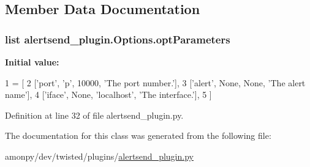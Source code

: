\subsection{Member Data Documentation}
\hypertarget{classalertsend__plugin_1_1_options_a2c75b6ad0c6ebcf82a12c75c4fe17c82}{
\subsubsection[{opt\-Parameters}]{\setlength{\rightskip}{0pt plus 5cm}list alertsend\-\_\-plugin.\-Options.\-opt\-Parameters\hspace{0.3cm}{\ttfamily [static]}}}\label{classalertsend__plugin_1_1_options_a2c75b6ad0c6ebcf82a12c75c4fe17c82}
{\bfseries Initial value\-:}
\begin{DoxyCode}
1 = [
2         [\textcolor{stringliteral}{'port'}, \textcolor{stringliteral}{'p'}, 10000, \textcolor{stringliteral}{'The port number.'}],
3         [\textcolor{stringliteral}{'alert'}, \textcolor{keywordtype}{None}, \textcolor{keywordtype}{None}, \textcolor{stringliteral}{'The alert name'}],
4         [\textcolor{stringliteral}{'iface'}, \textcolor{keywordtype}{None}, \textcolor{stringliteral}{'localhost'}, \textcolor{stringliteral}{'The interface.'}],
5         ]
\end{DoxyCode}


Definition at line 32 of file alertsend\-\_\-plugin.\-py.



The documentation for this class was generated from the following file\-:\begin{DoxyCompactItemize}
\item 
amonpy/dev/twisted/plugins/\hyperlink{alertsend__plugin_8py}{alertsend\-\_\-plugin.\-py}\end{DoxyCompactItemize}
